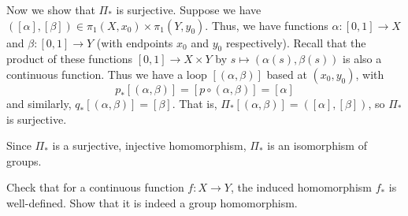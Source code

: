 \documentclass[12 pt, letterpaper]{hmcpset}
\begin{document}
\begin{solution}
	Now we show that $\Pi_{*}$ is surjective. Suppose we have $([\alpha], [\beta]) \in \pi_{1}(X, x_{0}) \times \pi_{1}(Y, y_{0})$. Thus, we have functions $\alpha : [0, 1] \to X$ and $\beta : [0, 1] \to Y$ (with endpoints $x_{0}$ and $y_{0}$ respectively). Recall that the product of these functions $[0, 1] \to X \times Y$ by $s \mapsto (\alpha(s), \beta(s))$ is also a continuous function. Thus we have a loop $[(\alpha, \beta)]$ based at $(x_{0}, y_{0})$, with
	\[
		p_{*}[(\alpha, \beta)] = [p \circ (\alpha, \beta)] = [\alpha]
	\]
	and similarly, $q_{*}[(\alpha, \beta)] = [\beta]$. That is, $\Pi_{*}[(\alpha, \beta)] = ([\alpha], [\beta])$, so $\Pi_{*}$ is surjective.

	Since $\Pi_{*}$ is a surjective, injective homomorphism, $\Pi_{*}$ is an isomorphism of groups.
\end{solution}

\pagebreak

\begin{problem}[12.23]
	Check that for a continuous function $f : X \to Y$, the induced homomorphism $f_{*}$ is well-defined. Show that it is indeed a group homomorphism.
\end{problem}
\end{document}
